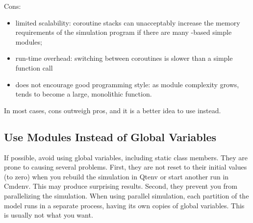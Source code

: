 Cons:
\begin{itemize}
   \item limited scalability: coroutine stacks can unacceptably increase the
       memory requirements of the simulation program if there are many
       -based simple modules;
   \item run-time overhead: switching between coroutines is slower than
       a simple function call
   \item does not encourage good programming style: as module complexity
       grows,  tends to become a large, monolithic function.
\end{itemize}

In most cases, cons outweigh pros, and it is a better idea to use
 instead.


%

\subsection{Use Modules Instead of Global Variables}
\label{sec:simple-modules:global-vars}

If possible, avoid using global variables, including
static class members. They are prone to causing several problems.
First, they are not reset to their initial values (to zero)
when you rebuild the simulation in Qtenv or start another run
in Cmdenv. This may produce surprising results.
Second, they prevent you from parallelizing the simulation.
When using parallel simulation, each partition of the model
runs in a separate process, having its own copies of
global variables. This is usually not what you want.

